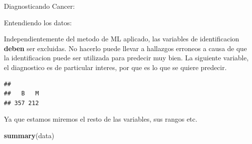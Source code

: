 \documentclass[ignorenonframetext,]{beamer}
\newenvironment{Shaded}{\begin{snugshade}}{\end{snugshade}}
\newcommand{\KeywordTok}[1]{\textcolor[rgb]{0.13,0.29,0.53}{\textbf{#1}}}
\newcommand{\OperatorTok}[1]{\textcolor[rgb]{0.81,0.36,0.00}{\textbf{#1}}}
\newcommand{\NormalTok}[1]{#1}
\begin{document}
\begin{frame}[fragile]
\begin{block}{Diagnosticando Cancer:}
\end{block}

\end{frame}

\begin{frame}[fragile]

\begin{block}{Entendiendo los datos:}

Independientemente del metodo de ML aplicado, las variables de
identificacion \textbf{deben} ser excluidas. No hacerlo puede llevar a
hallazgos erroneos a causa de que la identificacion puede ser utilizada
para predecir muy bien. La siguiente variable, el diagnostico es de
particular interes, por que es lo que se quiere predecir.

\begin{Shaded}
\end{Shaded}

\begin{verbatim}
## 
##   B   M 
## 357 212
\end{verbatim}

Ya que estamos miremos el resto de las variables, sus rangos etc.

\begin{Shaded}
\begin{Highlighting}[]
\KeywordTok{summary}\NormalTok{(data)}
\end{Highlighting}
\end{Shaded}


\end{block}
\end{frame}
\end{document}
